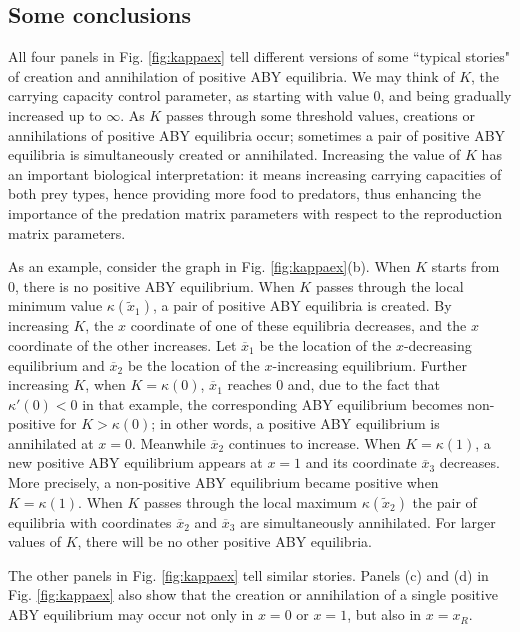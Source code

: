 \documentclass[12pt]{article}
\theoremstyle{definition}
\begin{document}
\subsection{Some conclusions}
All four panels in Fig. \ref{fig:kappaex} tell different versions of some ``typical stories" of creation and annihilation of positive ABY equilibria. We may think of $K$, the carrying capacity control parameter, as starting with value 0, and being gradually increased up to $\infty$. As $K$ passes through some threshold values, creations or annihilations of positive ABY equilibria occur; sometimes a pair of positive ABY equilibria is simultaneously created or annihilated. Increasing the value of $K$ has an important biological interpretation: it means increasing carrying capacities of both prey types, hence providing more food to predators, thus enhancing the importance of the predation matrix parameters with respect to the reproduction matrix parameters.

As an example, consider the graph in Fig. \ref{fig:kappaex}(b). When $K$ starts from 0, there is no positive ABY equilibrium. When $K$ passes through the local minimum value $\kappa(\tilde{x}_1)$, a pair of positive ABY equilibria is created. By increasing $K$, the $x$ coordinate of one of these equilibria decreases, and the $x$ coordinate of the other increases. Let $\overline{x}_1$ be the location of the $x$-decreasing equilibrium and $\overline{x}_2$ be the location of the $x$-increasing equilibrium. Further increasing $K$, when $K=\kappa(0)$, $\overline{x}_1$ reaches 0 and, due to the fact that $\kappa'(0)<0$ in that example, the corresponding ABY equilibrium becomes non-positive for $K>\kappa(0)$; in other words, a positive ABY equilibrium is annihilated at $x=0$. Meanwhile $\overline{x}_2$ continues to increase. When $K=\kappa(1)$, a new positive ABY equilibrium appears at $x=1$ and its coordinate $\overline{x}_3$ decreases. More precisely, a non-positive ABY equilibrium became positive when $K=\kappa(1)$. When $K$ passes through the local maximum $\kappa(\tilde{x}_2)$ the pair of equilibria with coordinates $\overline{x}_2$ and $\overline{x}_3$ are simultaneously annihilated. For larger values of $K$, there will be no other positive ABY equilibria.

The other panels in Fig. \ref{fig:kappaex} tell similar stories. Panels (c) and (d) in Fig. \ref{fig:kappaex} also show that the creation or annihilation of a single positive ABY equilibrium may occur not only in $x=0$ or $x=1$, but also in $x=x_R$.
\end{document}
